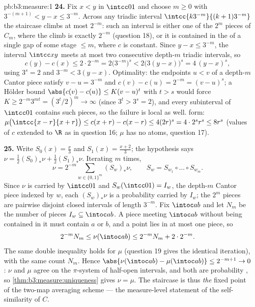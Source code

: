 \begin{solution}{pb:b3:measure:1}
\textbf{24.} Fix $x < y$ in $\intcc01$ and choose $m \geq 0$
with $3^{-(m+1)} < y - x \leq 3^{-m}$. Across any triadic
interval $\intcc{k3^{-m}}{(k+1)3^{-m}}$ the staircase climbs
at most $2^{-m}$: such an interval is either one of the $2^m$
pieces of $C_m$, where the climb is exactly $2^{-m}$ (question
18), or it is contained in the  of a single gap of some
stage $\leq m$, where $c$ is constant. Since $y - x \leq
3^{-m}$, the interval $\intcc xy$ meets at most two
consecutive depth-$m$ triadic intervals, so
\[
c(y) - c(x) \leq 2\cdot2^{-m}
= 2\bigl(3^{-m}\bigr)^{s}
< 2\bigl(3(y - x)\bigr)^{s}
= 4\,(y - x)^{s},
\]
using $3^{s} = 2$ and $3^{-m} < 3(y - x)$. Optimality: the
endpoints $u < v$ of a depth-$m$ Cantor piece satisfy $v - u =
3^{-m}$ and $c(v) - c(u) = 2^{-m} = (v - u)^{s}$; a H\"older
bound $\abs{c(v) - c(u)} \leq K(v - u)^{t}$ with $t > s$ would
force $K \geq 2^{-m}3^{mt} = (3^{t}/2)^{m} \to \infty$ (since
$3^{t} > 3^{s} = 2$), and every subinterval of $\intcc01$
contains such pieces, so the failure is local as well.
 form: $\mu\bigl(\intcc{x-r}{x+r}\bigr) \leq
c(x + r) - c(x - r) \leq 4(2r)^{s} = 4\cdot2^{s}r^{s} \leq
8r^{s}$ (values of $c$ extended to $\R$ as in question 16;
$\mu$ has no atoms, question 17).

\textbf{25.} Write $S_0(x) = \frac x3$ and $S_1(x) =
\frac{x+2}3$; the hypothesis says $\nu = \frac12(S_0)_*\nu +
\frac12(S_1)_*\nu$. Iterating $m$ times,
\[
\nu = 2^{-m}\sum_{w \in \{0,1\}^m}(S_w)_*\nu,
\qquad S_w = S_{w_1}\circ\dots\circ S_{w_m}.
\]
Since $\nu$ is carried by $\intcc01$ and $S_w(\intcc01) =
I_w$, the depth-$m$ Cantor piece indexed by $w$, each
$(S_w)_*\nu$ is a probability  carried by $I_w$; the
$2^m$ pieces are pairwise disjoint closed intervals of length
$3^{-m}$. Fix $\intoc ab$ and let $N_m$ be the number of
pieces $I_w \subseteq \intoc ab$. A piece meeting $\intoc ab$
without being contained in it must contain $a$ or $b$, and a
point lies in at most one piece, so
\[
2^{-m}N_m \leq \nu(\intoc ab) \leq 2^{-m}N_m + 2\cdot2^{-m}.
\]
The same double inequality holds for $\mu$ (question 19 gives
the identical iteration), with the same count $N_m$. Hence
$\abs{\nu(\intoc ab) - \mu(\intoc ab)} \leq 2^{-m+1} \to 0$:
$\nu$ and $\mu$ agree on the $\pi$-system of half-open
intervals, and both are probability , so
\cref{thm:b3:measure:uniqueness} gives $\nu = \mu$. The
staircase  is thus \emph{the} fixed point of the
two-map averaging scheme --- the measure-level statement of
the self-similarity of $C$.
\end{solution}
